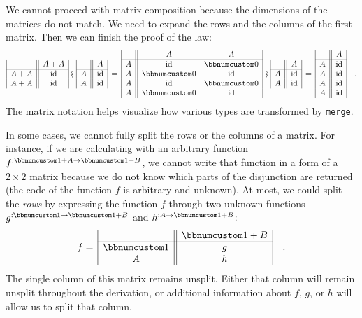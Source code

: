 We cannot proceed with matrix composition because the dimensions of
the matrices do not match. We need to expand the rows and the columns
of the first matrix. Then we can finish the proof of the law:
\[
\begin{array}{|c||c|}
 & A+A\\
\hline A+A & \text{id}\\
A+A & \text{id}
\end{array}\,\bef\,\begin{array}{|c||c|}
 & A\\
\hline A & \text{id}\\
A & \text{id}
\end{array}\,=\,\begin{array}{|c||cc|}
 & A & A\\
\hline A & \text{id} & \bbnum 0\\
A & \bbnum 0 & \text{id}\\
A & \text{id} & \bbnum 0\\
A & \bbnum 0 & \text{id}
\end{array}\,\bef\,\begin{array}{|c||c|}
 & A\\
\hline A & \text{id}\\
A & \text{id}
\end{array}\,=\,\begin{array}{|c||c|}
 & A\\
\hline A & \text{id}\\
A & \text{id}\\
A & \text{id}\\
A & \text{id}
\end{array}\quad.
\]
The matrix notation helps visualize how various types are transformed
by \lstinline!merge!.

In some cases, we cannot fully split the rows or the columns of a
matrix. For instance, if we are calculating with an arbitrary function
$f^{:\bbnum 1+A\rightarrow\bbnum 1+B}$, we cannot write that function
in a form of a $2\times2$ matrix because we do not know which parts
of the disjunction are returned (the code of the function $f$ is
arbitrary and unknown). At most, we could split the \emph{rows} by
expressing the function $f$ through two unknown functions $g^{:\bbnum 1\rightarrow\bbnum 1+B}$
and $h^{:A\rightarrow\bbnum 1+B}$:
\[
f=\,\begin{array}{|c||c|}
 & \bbnum 1+B\\
\hline \bbnum 1 & g\\
A & h
\end{array}\quad.
\]
The single column of this matrix remains unsplit. Either that column
will remain unsplit throughout the derivation, or additional information
about $f$, $g$, or $h$ will allow us to split that column.

